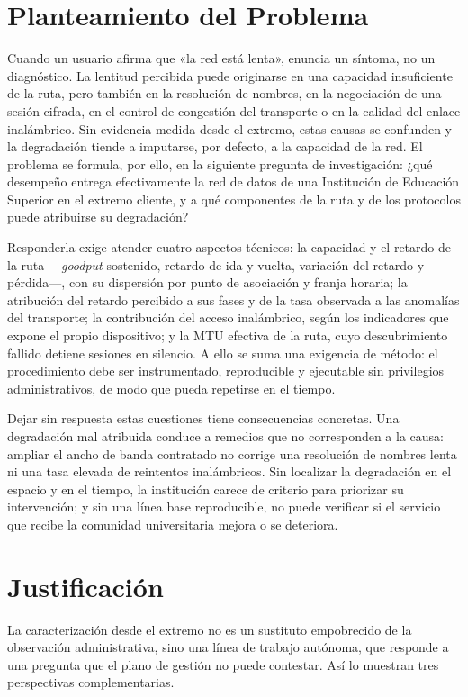 \section{Planteamiento del Problema}

Cuando un usuario afirma que «la red está lenta», enuncia un síntoma, no un diagnóstico. La lentitud percibida puede originarse en una capacidad insuficiente de la ruta, pero también en la resolución de nombres, en la negociación de una sesión cifrada, en el control de congestión del transporte o en la calidad del enlace inalámbrico. Sin evidencia medida desde el extremo, estas causas se confunden y la degradación tiende a imputarse, por defecto, a la capacidad de la red. El problema se formula, por ello, en la siguiente pregunta de investigación: ¿qué desempeño entrega efectivamente la red de datos de una Institución de Educación Superior en el extremo cliente, y a qué componentes de la ruta y de los protocolos puede atribuirse su degradación?

Responderla exige atender cuatro aspectos técnicos: la capacidad y el retardo de la ruta ---\textit{goodput} sostenido, retardo de ida y vuelta, variación del retardo y pérdida---, con su dispersión por punto de asociación y franja horaria; la atribución del retardo percibido a sus fases y de la tasa observada a las anomalías del transporte; la contribución del acceso inalámbrico, según los indicadores que expone el propio dispositivo; y la MTU efectiva de la ruta, cuyo descubrimiento fallido detiene sesiones en silencio. A ello se suma una exigencia de método: el procedimiento debe ser instrumentado, reproducible y ejecutable sin privilegios administrativos, de modo que pueda repetirse en el tiempo.

Dejar sin respuesta estas cuestiones tiene consecuencias concretas. Una degradación mal atribuida conduce a remedios que no corresponden a la causa: ampliar el ancho de banda contratado no corrige una resolución de nombres lenta ni una tasa elevada de reintentos inalámbricos. Sin localizar la degradación en el espacio y en el tiempo, la institución carece de criterio para priorizar su intervención; y sin una línea base reproducible, no puede verificar si el servicio que recibe la comunidad universitaria mejora o se deteriora.

\section{Justificación}

La caracterización desde el extremo no es un sustituto empobrecido de la observación administrativa, sino una línea de trabajo autónoma, que responde a una pregunta que el plano de gestión no puede contestar. Así lo muestran tres perspectivas complementarias.


